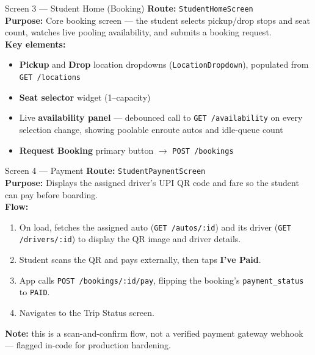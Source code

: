 \documentclass[11pt,a4paper]{article}
\begin{document}
\begin{screenbox}{Screen 3 --- Student Home (Booking)}
\textbf{Route:} \texttt{StudentHomeScreen} \\[4pt]
\textbf{Purpose:} Core booking screen --- the student selects pickup/drop stops and
seat count, watches live pooling availability, and submits a booking request. \\[4pt]
\textbf{Key elements:}
\begin{itemize}[leftmargin=*, itemsep=1pt]
  \item \textbf{Pickup} and \textbf{Drop} location dropdowns (\texttt{LocationDropdown}),
        populated from \texttt{GET /locations}
  \item \textbf{Seat selector} widget (1--capacity)
  \item Live \textbf{availability panel} --- debounced call to
        \texttt{GET /availability} on every selection change, showing poolable
        enroute autos and idle-queue count
  \item \textbf{Request Booking} primary button $\rightarrow$ \texttt{POST /bookings}
\end{itemize}
\end{screenbox}

\begin{screenbox}{Screen 4 --- Payment}
\textbf{Route:} \texttt{StudentPaymentScreen} \\[4pt]
\textbf{Purpose:} Displays the assigned driver's UPI QR code and fare so the student
can pay before boarding. \\[4pt]
\textbf{Flow:}
\begin{enumerate}[leftmargin=*, itemsep=1pt]
  \item On load, fetches the assigned auto (\texttt{GET /autos/:id}) and its driver
        (\texttt{GET /drivers/:id}) to display the QR image and driver details.
  \item Student scans the QR and pays externally, then taps \textbf{I've Paid}.
  \item App calls \texttt{POST /bookings/:id/pay}, flipping the booking's
        \texttt{payment\_status} to \texttt{PAID}.
  \item Navigates to the Trip Status screen.
\end{enumerate}
\textbf{Note:} this is a scan-and-confirm flow, not a verified payment gateway
webhook --- flagged in-code for production hardening.
\end{screenbox}
\end{document}
